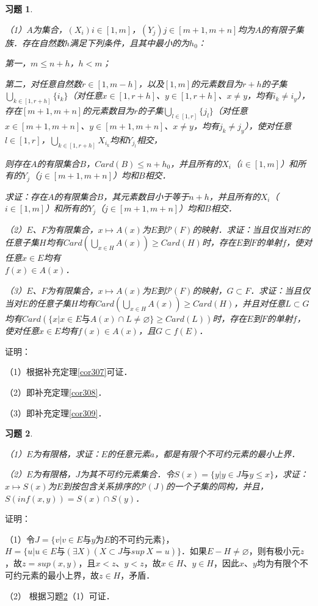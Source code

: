 \documentclass[12pt, a4paper, oneside]{book}
\newtheorem{exer}{习题}
\begin{document}
			\begin{exer}\label{exer132}
				\hfill\par
				（1）$A$为集合，$(X_i)i\in [1, m]$，$(Y_j)j\in [m+1, m+n]$均为$A$的有限子集族．存在自然数$h$满足下列条件，且其中最小的为$h_0$：
				\par
				第一，$m\leq n+h$，$h<m$；
				\par
				第二，对任意自然数$r\in [1, m-h]$，以及$[1, m]$的元素数目为$r+h$的子集$\bigcup\limits_{k\in [1, r+h]}\{i_k\}$（对任意$x\in [1, r+h]$、$y \in [1, r+h]$、$x\neq y$，均有$i_k\neq i_y$），存在$[m+1, m+n]$的元素数目为$r$的子集$\bigcup\limits_{l\in [1, r]}\{j_l\}$（对任意$x\in [m+1, m+n]$、$y \in [m+1, m+n]$、$x\neq y$，均有$j_k\neq j_y$），使对任意$l\in [1, r]$，$\bigcup\limits_{k\in [1, r+h]}X_{i_k}$均和$Y_{j_l}$相交，
				\par
				则存在$A$的有限集合$B$，$Card(B)\leq n+h_0$，并且所有的$X_i$（$i\in [1, m]$）和所有的$Y_j$（$j\in [m+1, m+n]$）均和$B$相交．
				\par
				求证：存在$A$的有限集合$B$，其元素数目小于等于$n+h$，并且所有的$X_i$（$i\in [1, m]$）和所有的$Y_j$（$j\in [m+1, m+n]$）均和$B$相交．
				\par
				（2）$E$、$F$为有限集合，$x\mapsto A(x)$为$E$到$\mathcal{P}(F)$的映射．求证：当且仅当对$E$的任意子集$H$均有$Card(\bigcup\limits_{x\in H}A(x))\geq Card(H)$时，存在$E$到$F$的单射$f$，使对任意$x\in E$均有\\$f(x)\in A(x)$．
				\par
				（3）$E$、$F$为有限集合，$x\mapsto A(x)$为$E$到$\mathcal{P}(F)$的映射，$G\subset F$．求证：当且仅当对$E$的任意子集$H$均有$Card(\bigcup\limits_{x\in H}A(x))\geq Card(H)$，并且对任意$L\subset G$均有$Card(\{x|x\in E\text{与}A(x)\cap L\neq \varnothing\}\geq Card(L))$时，存在$E$到$F$的单射$f$，使对任意$x\in E$均有$f(x)\in A(x)$，且$G\subset f(E)$．
			\end{exer}
			证明：
			\par
			（1）根据补充定理\ref{cor307}可证．
			\par
			（2）即补充定理\ref{cor308}．
			\par
			（3）即补充定理\ref{cor309}．
			
			\begin{exer}\label{exer133}
				\hfill\par
				（1）$E$为有限格，求证：$E$的任意元素$a$，都是有限个不可约元素的最小上界．
				\par
				（2）$E$为有限格，$J$为其不可约元素集合．令$S(x)=\{y|y\in J\text{与}y\leq x\}$，求证：$x\mapsto S(x)$为$E$到按包含关系排序的$\mathcal{P}(J)$的一个子集的同构，并且，$S(inf(x, y))=S(x)\cap S(y)$．
			\end{exer}
			证明：
			\par
			（1）令$J=\{v|v\in E\text{与}y\text{为}E\text{的不可约元素}\}$，$H=\{u|u\in E\text{与}(\exists X)(X\subset J\text{与}sup\ X=u)\}$．如果$E-H\neq \varnothing$，则有极小元$z$，故$z=sup(x, y)$，且$x<z$、$y<z$，故$x\in H$、$y\in H$，因此$x$、$y$均为有限个不可约元素的最小上界，故$z\in H$，矛盾．
			\par
			（2）	根据习题\ref{exer133}（1）可证．
			
\end{document}
